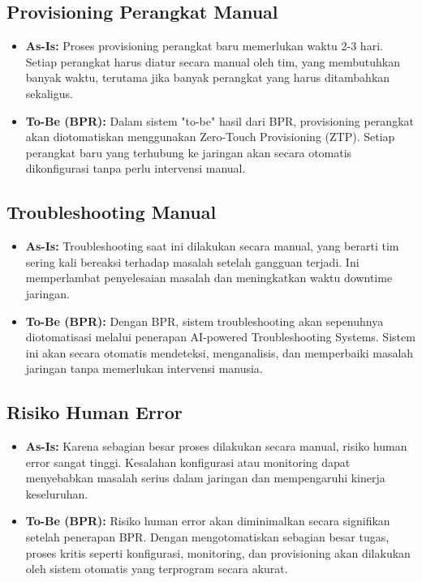 \subsection{Provisioning Perangkat Manual}
\begin{itemize}
    \item \textbf{As-Is:} Proses provisioning perangkat baru memerlukan waktu 2-3 hari. Setiap perangkat harus diatur secara manual oleh tim, yang membutuhkan banyak waktu, terutama jika banyak perangkat yang harus ditambahkan sekaligus.
    
    \item \textbf{To-Be (BPR):} Dalam sistem "to-be" hasil dari BPR, provisioning perangkat akan diotomatiskan menggunakan Zero-Touch Provisioning (ZTP). Setiap perangkat baru yang terhubung ke jaringan akan secara otomatis dikonfigurasi tanpa perlu intervensi manual.
\end{itemize}

\subsection{Troubleshooting Manual}
\begin{itemize}
    \item \textbf{As-Is:} Troubleshooting saat ini dilakukan secara manual, yang berarti tim sering kali bereaksi terhadap masalah setelah gangguan terjadi. Ini memperlambat penyelesaian masalah dan meningkatkan waktu downtime jaringan.
    
    \item \textbf{To-Be (BPR):} Dengan BPR, sistem troubleshooting akan sepenuhnya diotomatisasi melalui penerapan AI-powered Troubleshooting Systems. Sistem ini akan secara otomatis mendeteksi, menganalisis, dan memperbaiki masalah jaringan tanpa memerlukan intervensi manusia.
\end{itemize}

\subsection{Risiko Human Error}
\begin{itemize}
    \item \textbf{As-Is:} Karena sebagian besar proses dilakukan secara manual, risiko human error sangat tinggi. Kesalahan konfigurasi atau monitoring dapat menyebabkan masalah serius dalam jaringan dan mempengaruhi kinerja keseluruhan.
    
    \item \textbf{To-Be (BPR):} Risiko human error akan diminimalkan secara signifikan setelah penerapan BPR. Dengan mengotomatiskan sebagian besar tugas, proses kritis seperti konfigurasi, monitoring, dan provisioning akan dilakukan oleh sistem otomatis yang terprogram secara akurat.
\end{itemize}

